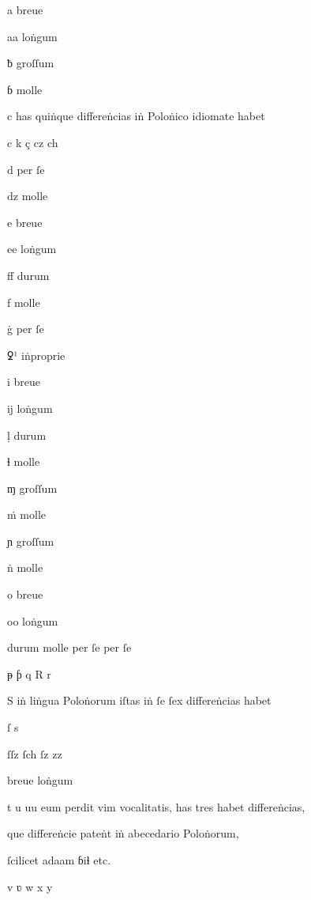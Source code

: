 {%





a breue 

aa loṅgum 

ƀ groſſum 

ɓ molle

c has quiṅque differeṅcias iṅ Poloṅico idiomate habet

c k ç cz ch

d per ſe 

dz molle 

e breue 

ee loṅgum 

ﬀ durum 

f molle




ġ per ſe 

ꝿ¹  iṅproprie 

i breue 

ĳ loṅgum 

ḷ durum 

ɬ molle 



ɱ groſſum 

ṁ molle 

ɲ groſſum 

ṅ molle 

o breue 

oo loṅgum


durum molle per ſe per ſe

ᵽ ƥ q R r

S iṅ liṅgua Poloṅorum iſtas iṅ ſe ſex differeṅcias habet

ſ s 

ſſz ſch ſz zz

breue	loṅgum


t u uu eum perdit vim vocalitatis, has tres habet differeṅcias, 

que differeṅcie pateṅt iṅ abecedario Poloṅorum, 

ſcilicet adaam ɓiɬ etc.

v ʋ w	x y

}

